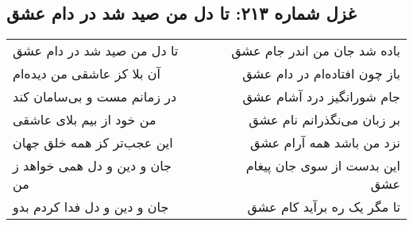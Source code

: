 \begin{center}
\section*{غزل شماره ۲۱۳: تا دل من صید شد در دام عشق}
\label{sec:213}
\begin{longtable}{l p{0.5cm} r}
تا دل من صید شد در دام عشق
&&
باده شد جان من اندر جام عشق
\\
آن بلا کز عاشقی من دیده‌ام
&&
باز چون افتاده‌ام در دام عشق
\\
در زمانم مست و بی‌سامان کند
&&
جام شورانگیز درد آشام عشق
\\
من خود از بیم بلای عاشقی
&&
بر زبان می‌نگذرانم نام عشق
\\
این عجب‌تر کز همه خلق جهان
&&
نزد من باشد همه آرام عشق
\\
جان و دین و دل همی خواهد ز من
&&
این بدست از سوی جان پیغام عشق
\\
جان و دین و دل فدا کردم بدو
&&
تا مگر یک ره برآید کام عشق
\\
\end{longtable}
\end{center}
